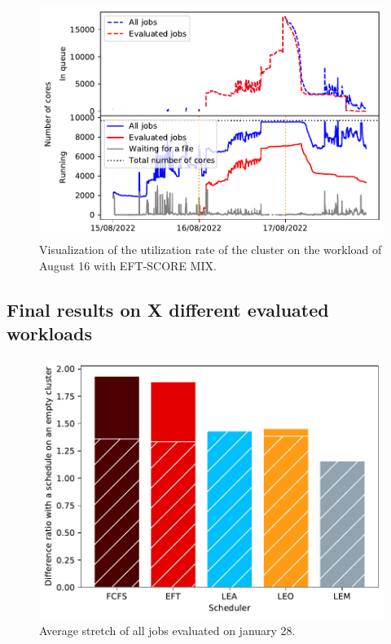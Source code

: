 \documentclass[conference,10pt]{IEEEtran}
\begin{document}
\begin{figure}[H]\centering\includegraphics[scale=0.47]{../MBSS/plot/Cluster_usage/2022-08-16->2022-08-16_V10000_Fcfs_with_a_score_mixed_strategy_x500_x1_x0_x0_Used_nodes_Reduced_450_128_32_256_4_1024_core_by_core.pdf}\caption{Visualization of the utilization rate of the cluster on the workload of August 16 with EFT-SCORE MIX.}\end{figure}


\subsection{Final results on X different evaluated workloads}

\begin{figure}[tb]\centering\includegraphics[scale=0.47]{../MBSS/plot/BF_AND_NON_BF_Results_FCFS_Score_Backfill_2022-01-28->2022-01-28_V10000_Mean_Stretch_450_128_32_256_4_1024.pdf}\caption{Average stretch of all jobs evaluated on january 28.}\end{figure}
\end{document}
